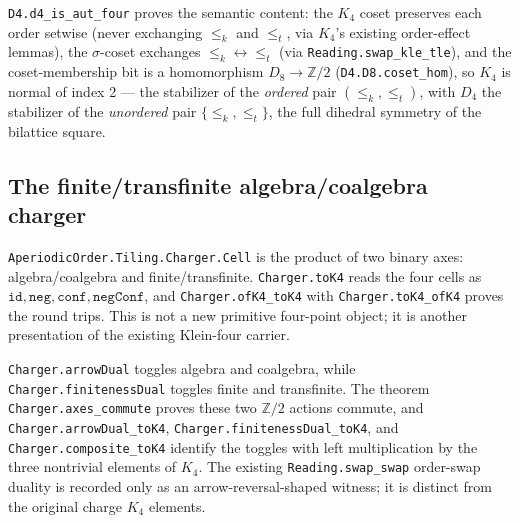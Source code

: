 \begin{theorem}[$D_4 = \mathrm{Aut}(\mathrm{FOUR}; \{\le_k, \le_t\})$]\label{thm:d4-is-aut-four}\leanok{}
\texttt{D4.d4\_is\_aut\_four} proves the semantic content: the $K_4$ coset preserves each order
setwise (never exchanging $\le_k$ and $\le_t$, via $K_4$'s existing order-effect lemmas), the
$\sigma$-coset exchanges $\le_k \leftrightarrow \le_t$ (via \texttt{Reading.swap\_kle\_tle}), and the
coset-membership bit is a homomorphism $D_8 \to \mathbb{Z}/2$ (\texttt{D4.D8.coset\_hom}), so $K_4$
is normal of index 2 --- the stabilizer of the \emph{ordered} pair $(\le_k, \le_t)$, with $D_4$ the
stabilizer of the \emph{unordered} pair $\{\le_k, \le_t\}$, the full dihedral symmetry of the
bilattice square.
\end{theorem}

\subsection{The finite/transfinite algebra/coalgebra charger}

\begin{proposition}\label{thm:finite-infinite-charger-k4}\leanok{}
\texttt{AperiodicOrder.Tiling.Charger.Cell} is the product of two binary axes:
algebra/coalgebra and finite/transfinite.  \texttt{Charger.toK4} reads the four
cells as \(\texttt{id},\texttt{neg},\texttt{conf},\texttt{negConf}\), and
\texttt{Charger.ofK4\_toK4} with \texttt{Charger.toK4\_ofK4} proves the
round trips.  This is not a new primitive four-point object; it is another
presentation of the existing Klein-four carrier.
\end{proposition}

\begin{theorem}\label{thm:finite-infinite-charger-axes}\leanok{}
\texttt{Charger.arrowDual} toggles algebra and coalgebra, while
\texttt{Charger.finitenessDual} toggles finite and transfinite.  The theorem
\texttt{Charger.axes\_commute} proves these two \(\mathbb{Z}/2\) actions commute,
and \texttt{Charger.arrowDual\_toK4}, \texttt{Charger.finitenessDual\_toK4},
and \texttt{Charger.composite\_toK4} identify the toggles with left
multiplication by the three nontrivial elements of \(K_4\).  The existing
\texttt{Reading.swap\_swap} order-swap duality is recorded only as an
arrow-reversal-shaped witness; it is distinct from the original charge \(K_4\)
elements.
\end{theorem}

